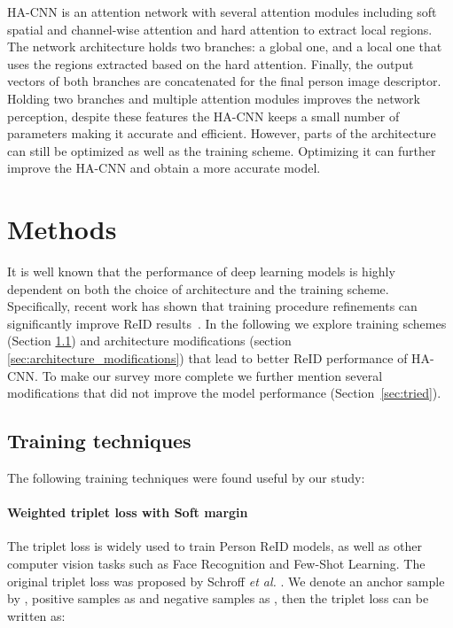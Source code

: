 \documentclass[sigconf]{acmart}
\begin{document}
HA-CNN is an attention network with several attention modules including soft spatial and channel-wise attention and hard attention to extract local regions. The network architecture holds two branches: a global one, and a local one that uses the regions extracted based on the hard attention. Finally, the output vectors of both branches are concatenated for the final person image descriptor. Holding two branches and multiple attention modules improves the network perception, despite these features the HA-CNN keeps a small number of parameters making it accurate and efficient. However, parts of the architecture can still be optimized as well as the training scheme. Optimizing it can further improve the HA-CNN and obtain a more accurate model.

\section{Methods}
\label{sec:tricks}
It is well known that the performance of deep learning models is highly dependent on both the choice of architecture and the training scheme. Specifically, recent work has shown that training procedure refinements can significantly improve ReID results~\cite{luo2019bag}.
In the following we explore training schemes (Section \ref{sec:training_techniques}) and architecture modifications (section \ref{sec:architecture_modifications}) that lead to better ReID performance of HA-CNN.
To make our survey more complete we further mention several modifications that did not improve the model performance (Section~\ref{sec:tried}).

\subsection{Training techniques}
\label{sec:training_techniques}
The following training techniques were found useful by our study:

\paragraph{Weighted triplet loss with Soft margin}
The triplet loss is widely used to train Person ReID models, as well as other computer vision tasks such as Face Recognition and Few-Shot Learning. The original triplet loss was proposed by Schroff \textit{et al.} \cite{schroff2015facenet}. We denote an anchor sample by , positive samples as  and negative samples as , then the triplet loss can be written as:
\end{document}
